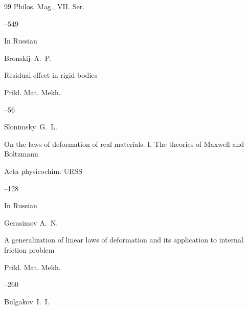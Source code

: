 \documentclass[11pt,a4paper,twoside]{article}
\begin{document}
\begin{thebibliography}{99}
\jour Philos. Mag., VII. Ser.




--549 











\lang In Russian


\by Bronskij~A.~P.


\paper Residual effect in rigid bodies


\jour Prikl. Mat. Mekh. 








--56










\by Slonimsky~G.~L.


\paper On the laws of deformation of real materials. I. The theories of Maxwell and Boltzmann


\jour Acta physicochim. URSS 




--128 











\lang In Russian


\by Gerasimov A.~N.


\paper A generalization of linear laws of deformation and its application to internal friction problem


\jour  Prikl. Mat. Mekh. 








--260









\by Bulgakov~I.~I.



\end{thebibliography}
\end{document}
